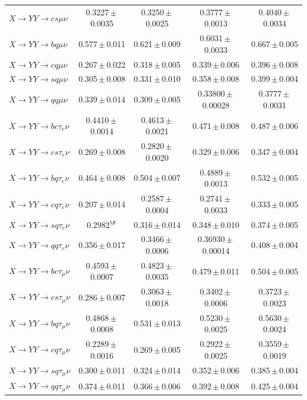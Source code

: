 \documentclass[12pt]{article}   %
\begin{document}
\begin{landscape}
{\begin{longtable}{@{\extracolsep{\fill}}lcccc@{}}
$X\to YY\to cs\mu\nu$ & 0.3227\,$\pm$\,0.0035 & 0.3250\,$\pm$\,0.0025 & 0.3777\,$\pm$\,0.0013 & 0.4040\,$\pm$\,0.0034 \\
$X\to YY\to bq\mu\nu$ & 0.577\,$\pm$\,0.011 & 0.621\,$\pm$\,0.009 & 0.6031\,$\pm$\,0.0033 & 0.667\,$\pm$\,0.005 \\
$X\to YY\to cq\mu\nu$ & 0.267\,$\pm$\,0.022 & 0.318\,$\pm$\,0.005 & 0.339\,$\pm$\,0.006 & 0.396\,$\pm$\,0.008 \\
$X\to YY\to sq\mu\nu$ & 0.305\,$\pm$\,0.008 & 0.331\,$\pm$\,0.010 & 0.358\,$\pm$\,0.008 & 0.399\,$\pm$\,0.004 \\
$X\to YY\to qq\mu\nu$ & 0.339\,$\pm$\,0.014 & 0.309\,$\pm$\,0.005 & 0.33800\,$\pm$\,0.00028 & 0.3777\,$\pm$\,0.0031 \\
\midrule
$X\to YY\to bc\tau_e\nu$ & 0.4410\,$\pm$\,0.0014 & 0.4613\,$\pm$\,0.0021 & 0.471\,$\pm$\,0.008 & 0.487\,$\pm$\,0.006 \\
$X\to YY\to cs\tau_e\nu$ & 0.269\,$\pm$\,0.008 & 0.2820\,$\pm$\,0.0020 & 0.329\,$\pm$\,0.006 & 0.347\,$\pm$\,0.004 \\
$X\to YY\to bq\tau_e\nu$ & 0.464\,$\pm$\,0.008 & 0.504\,$\pm$\,0.007 & 0.4889\,$\pm$\,0.0013 & 0.532\,$\pm$\,0.005 \\
$X\to YY\to cq\tau_e\nu$ & 0.207\,$\pm$\,0.014 & 0.2587\,$\pm$\,0.0004 & 0.2741\,$\pm$\,0.0033 & 0.333\,$\pm$\,0.005 \\
$X\to YY\to sq\tau_e\nu$ & 0.2982$^{\P}$ & 0.316\,$\pm$\,0.014 & 0.348\,$\pm$\,0.010 & 0.374\,$\pm$\,0.005 \\
$X\to YY\to qq\tau_e\nu$ & 0.356\,$\pm$\,0.017 & 0.3466\,$\pm$\,0.0006 & 0.36930\,$\pm$\,0.00014 & 0.408\,$\pm$\,0.004 \\
$X\to YY\to bc\tau_\mu\nu$ & 0.4593\,$\pm$\,0.0007 & 0.4823\,$\pm$\,0.0035 & 0.479\,$\pm$\,0.011 & 0.504\,$\pm$\,0.005 \\
$X\to YY\to cs\tau_\mu\nu$ & 0.286\,$\pm$\,0.007 & 0.3063\,$\pm$\,0.0018 & 0.3402\,$\pm$\,0.0006 & 0.3723\,$\pm$\,0.0023 \\
$X\to YY\to bq\tau_\mu\nu$ & 0.4868\,$\pm$\,0.0008 & 0.531\,$\pm$\,0.013 & 0.5230\,$\pm$\,0.0025 & 0.5630\,$\pm$\,0.0024 \\
$X\to YY\to cq\tau_\mu\nu$ & 0.2289\,$\pm$\,0.0016 & 0.269\,$\pm$\,0.005 & 0.2922\,$\pm$\,0.0025 & 0.3559\,$\pm$\,0.0019 \\
$X\to YY\to sq\tau_\mu\nu$ & 0.300\,$\pm$\,0.011 & 0.324\,$\pm$\,0.014 & 0.352\,$\pm$\,0.006 & 0.385\,$\pm$\,0.004 \\
$X\to YY\to qq\tau_\mu\nu$ & 0.374\,$\pm$\,0.011 & 0.366\,$\pm$\,0.006 & 0.392\,$\pm$\,0.008 & 0.425\,$\pm$\,0.004 \\

\end{longtable}}
\end{landscape}
\end{document}
